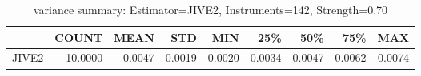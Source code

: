 \begin{table}[ht]
\centering
\caption{variance summary: Estimator=JIVE2, Instruments=142, Strength=0.70}
\begin{tabular}{lrrrrrrrr}
\toprule
 & COUNT & MEAN & STD & MIN & 25\% & 50\% & 75\% & MAX \\
\midrule
JIVE2 & 10.0000 & 0.0047 & 0.0019 & 0.0020 & 0.0034 & 0.0047 & 0.0062 & 0.0074 \\
\bottomrule
\end{tabular}
\end{table}
